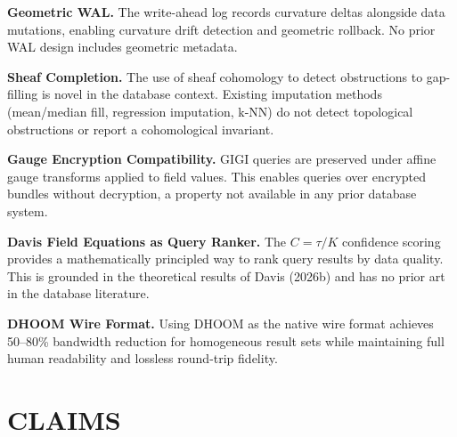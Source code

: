 \documentclass[11pt,letterpaper]{article}
\begin{document}
\textbf{Geometric WAL.} The write-ahead log records curvature deltas alongside data mutations, enabling curvature drift detection and geometric rollback. No prior WAL design includes geometric metadata.

\textbf{Sheaf Completion.} The use of sheaf cohomology to detect obstructions to gap-filling is novel in the database context. Existing imputation methods (mean/median fill, regression imputation, k-NN) do not detect topological obstructions or report a cohomological invariant.

\textbf{Gauge Encryption Compatibility.} GIGI queries are preserved under affine gauge transforms applied to field values. This enables queries over encrypted bundles without decryption, a property not available in any prior database system.

\textbf{Davis Field Equations as Query Ranker.} The $C = \tau/K$ confidence scoring provides a mathematically principled way to rank query results by data quality. This is grounded in the theoretical results of Davis (2026b) and has no prior art in the database literature.

\textbf{DHOOM Wire Format.} Using DHOOM as the native wire format achieves 50--80\% bandwidth reduction for homogeneous result sets while maintaining full human readability and lossless round-trip fidelity.


\newpage
\section*{CLAIMS}
\end{document}
